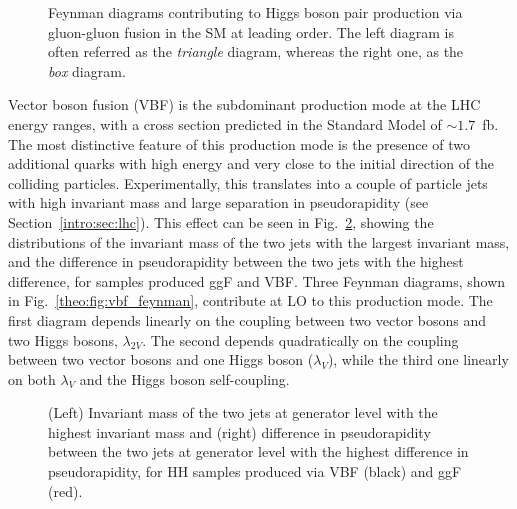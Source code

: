 \documentclass[../main.tex]{subfiles}
\begin{document}
\begin{figure}[h!]
\begin{center}
\end{center}
\caption{Feynman diagrams contributing to Higgs boson pair production via gluon-gluon fusion in the SM at leading order. The left diagram is often referred as the \textit{triangle} diagram, whereas the right one, as the \textit{box} diagram.}
\label{theo:fig:ggf_feynman}
\end{figure}

Vector boson fusion (VBF) is the subdominant production mode at the LHC energy ranges, with a cross section predicted in the Standard Model of $\sim1.7$~fb. The most distinctive feature of this production mode is the presence of two additional quarks with high energy and very close to the initial direction of the colliding particles. Experimentally, this translates into a couple of particle jets with high invariant mass and large separation in pseudorapidity (see Section~\ref{intro:sec:lhc}). This effect can be seen in Fig.~\ref{theo:fig:genjj}, showing the distributions of the invariant mass of the two jets with the largest invariant mass, and the difference in pseudorapidity between the two jets with the highest difference, for samples produced ggF and VBF. Three Feynman diagrams, shown in Fig.~\ref{theo:fig:vbf_feynman}, contribute at LO to this production mode. The first diagram depends linearly on the coupling between two vector bosons and two Higgs bosons, $\lambda_{2V}$. The second depends quadratically on the coupling between two vector bosons and one Higgs boson ($\lambda_{V}$), while the third one linearly on both $\lambda_{V}$ and the Higgs boson self-coupling.

\begin{figure}[h!]
\begin{center}
\end{center}
\caption{(Left) Invariant mass of the two jets at generator level with the highest invariant mass and (right) difference in pseudorapidity between the two jets at generator level with the highest difference in pseudorapidity, for HH samples produced via VBF (black) and ggF (red).}
\label{theo:fig:genjj}
\end{figure}
\end{document}
